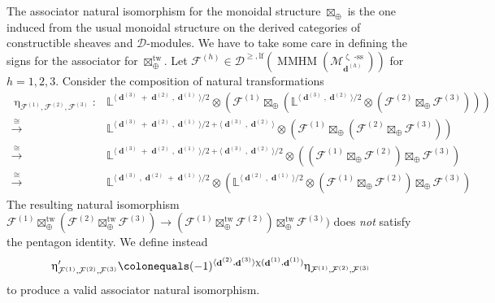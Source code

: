 \documentclass[a4paper,10pt]{amsart}
\renewcommand{\zeta}{\upzeta}
\renewcommand{\chi}{\upchi}
\renewcommand{\eta}{\upeta}
\newcommand{\LL}{\mathbb{L}}
\newcommand{\Msp}{\mathcal{M}}
\DeclareMathOperator{\sst}{-ss}
\DeclareMathOperator{\tw}{tw}
\DeclareMathOperator{\MMHM}{MMHM}
\DeclareMathOperator{\dd}{\mathbf{d}}
\newcommand{\Dulf}{\mathcal{D}^{\geq, \mathrm{lf}}}
\begin{document}
The associator natural isomorphism for the monoidal structure $\boxtimes_{\oplus}$ is the one induced from the usual monoidal structure on the derived categories of constructible sheaves and $\mathcal{D}$-modules.  We have to take some care in defining the signs for the associator for $\boxtimes_{\oplus}^{\tw}$.  Let $\mathcal{F}^{(h)}\in\Dulf(\MMHM(\Msp^{\zeta\sst}_{\dd^{(h)}}))$ for $h=1,2,3$.  Consider the composition of natural transformations
\begin{align*}
\eta_{\mathcal{F}^{(1)},\mathcal{F}^{(2)},\mathcal{F}^{(3)}}\colon &\LL^{\langle \dd^{(3)}+\dd^{(2)},\dd^{(1)}\rangle/2}\otimes\left(\mathcal{F}^{(1)}\boxtimes_{\oplus} \left(\LL^{\langle \dd^{(3)},\dd^{(2)}\rangle/2}\otimes(\mathcal{F}^{(2)}\boxtimes_{\oplus}  \mathcal{F}^{(3)})\right)\right)
\\
\xrightarrow{\cong}&\LL^{\langle \dd^{(3)}+\dd^{(2)},\dd^{(1)}\rangle/2+\langle \dd^{(3)},\dd^{(2)}\rangle}\otimes\left(\mathcal{F}^{(1)}\boxtimes_{\oplus} \left(\mathcal{F}^{(2)}\boxtimes_{\oplus}  \mathcal{F}^{(3)}\right)\right)
\\
\xrightarrow{\cong}&\LL^{\langle \dd^{(3)}+\dd^{(2)},\dd^{(1)}\rangle/2+\langle \dd^{(3)},\dd^{(2)}\rangle/2}\otimes\left(\left(\mathcal{F}^{(1)}\boxtimes_{\oplus} \mathcal{F}^{(2)}\right)\boxtimes_{\oplus}  \mathcal{F}^{(3)}\right)
\\
\xrightarrow{\cong}&\LL^{\langle \dd^{(3)},\dd^{(2)}+\dd^{(1)}\rangle/2}\otimes \left(\LL^{\langle \dd^{(2)},\dd^{(1)}\rangle/2}\otimes\left(\mathcal{F}^{(1)}\boxtimes_{\oplus} \mathcal{F}^{(2)}\right)\boxtimes_{\oplus}  \mathcal{F}^{(3)}\right)
\end{align*}
The resulting natural isomorphism $\mathcal{F}^{(1)}\boxtimes_{\oplus}^{\tw}(\mathcal{F}^{(2)}\boxtimes_{\oplus}^{\tw}\mathcal{F}^{(3)})\rightarrow (\mathcal{F}^{(1)}\boxtimes_{\oplus}^{\tw}\mathcal{F}^{(2)})\boxtimes_{\oplus}^{\tw}\mathcal{F}^{(3)})$ does \textit{not} satisfy the pentagon identity.  We define instead
\begin{equation}
\label{AssocSign}
\eta_{\mathcal{F}^{(1)},\mathcal{F}^{(2)},\mathcal{F}^{(3)}}'\colonequals (-1)^{\langle \dd^{(2)},\dd^{(3)}\rangle \chi(\dd^{(1)},\dd^{(1)})}\eta_{\mathcal{F}^{(1)},\mathcal{F}^{(2)},\mathcal{F}^{(3)}}
\end{equation}
to produce a valid associator natural isomorphism.
\end{document}
